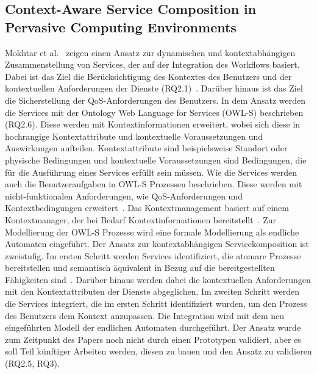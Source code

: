 \documentclass[conference,compsoc]{IEEEtran}
\begin{document}
\subsection{Context-Aware Service Composition in Pervasive Computing Environments}
Mokhtar et al.~\cite{mokhtar2005context} zeigen einen Ansatz zur dynamischen und kontextabhängigen Zusammenstellung von Services, der auf der Integration des Workflows basiert. Dabei ist das Ziel die Berücksichtigung des Kontextes des Benutzers und der kontextuellen Anforderungen der Dienste (RQ2.1)~\cite{mokhtar2005context}. Darüber hinaus ist das Ziel die Sicherstellung der QoS-Anforderungen des Benutzers. In dem Ansatz werden die Services mit der Ontology Web Language for Services (OWL-S) beschrieben (RQ2.6). Diese werden mit Kontextinformationen erweitert, wobei sich diese in hochrangige Kontextattribute und kontextuelle Voraussetzungen und Auswirkungen aufteilen. Kontextattribute sind beispielsweise Standort oder physische Bedingungen und kontextuelle Voraussetzungen sind Bedingungen, die für die Ausführung eines Services erfüllt sein müssen. Wie die Services werden auch die Benutzeraufgaben in OWL-S Prozessen beschrieben. Diese werden mit nicht-funktionalen Anforderungen, wie QoS-Anforderungen und Kontextbedingungen erweitert~\cite{mokhtar2005context}. Das Kontextmanagement basiert auf einem Kontextmanager, der bei Bedarf Kontextinformationen bereitstellt~\cite{mokhtar2005context}.
Zur Modellierung der OWL-S Prozesse wird eine formale Modellierung als endliche Automaten eingeführt.
Der Ansatz zur kontextabhängigen Servicekomposition ist zweistufig. Im ersten Schritt werden Services identifiziert, die atomare Prozesse bereitstellen und semantisch äquivalent in Bezug auf die bereitgestellten Fähigkeiten sind~\cite{mokhtar2005context}. Darüber hinaus werden dabei die kontextuellen Anforderungen mit den Kontextattributen der Dienste abgeglichen.
Im zweiten Schritt werden die Services integriert, die im ersten Schritt identifiziert wurden, um den Prozess des Benutzers dem Kontext anzupassen. Die Integration wird mit dem neu eingeführten Modell der endlichen Automaten durchgeführt.
Der Ansatz wurde zum Zeitpunkt des Papers noch nicht durch einen Prototypen validiert, aber es soll Teil künftiger Arbeiten werden, diesen zu bauen und den Ansatz zu validieren (RQ2.5, RQ3).
\end{document}
